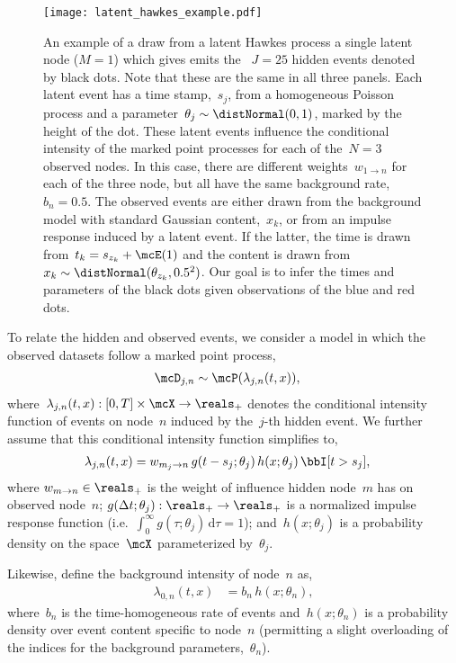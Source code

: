 \begin{figure}[t!]
\texttt{[image: latent\_hawkes\_example.pdf]}
\caption{An example of a draw from a latent Hawkes process
a single latent node ($M=1$) which gives emits the ~$J=25$ hidden
events denoted by black dots.  Note that these are the same in
all three panels. Each latent event has a time
stamp,~$s_j$, from a homogeneous Poisson process and a
parameter~$\theta_j \sim \distNormal(0,1)$, marked by the height of
the dot. These latent events influence the conditional intensity of
the marked point processes for each of the~$N=3$ observed nodes. In
this case, there are different weights~$w_{1 \to n}$ for each of the
three node, but all have the same background rate,~$b_n=0.5$. The
observed events are either drawn from the background model with
standard Gaussian content,~$x_k$, or from an impulse response induced
by a latent event. If the latter, the time is drawn from~$t_k =
s_{z_k} + \mcE(1)$ and the content is drawn from
$x_k \sim \distNormal(\theta_{z_k}, 0.5^2)$. Our goal is to infer the
times and parameters of the black dots given observations of the blue
and red dots.}
\end{figure}

To relate the hidden and observed events,
we consider a model in which the observed datasets follow a marked
point process,
\begin{align}
  \mcD_{j,n} &\sim \mcP(\lambda_{j,n}(t, x)),
\end{align}
where~$\lambda_{j,n}(t, x): [0,T] \times \mcX \to \reals_+$ denotes
the conditional intensity function of events on node~$n$ induced by
the~$j$-th hidden event.  We further assume that this conditional
intensity function simplifies to,
\begin{align}
  \lambda_{j,n}(t, x)
  &= w_{m_j \to n} \, g(t-s_j; \theta_j) \, h(x; \theta_j) \, \bbI[t > s_j],
\end{align}
where $w_{m \to n} \in \reals_+$ is the weight of influence hidden
node~$m$ has on observed node~$n$; ${g(\Delta
t; \theta_j): \reals_+ \to \reals_+}$ is a normalized impulse response
function (i.e.~$\int_0^\infty g(\tau; \theta_j) \, \mathrm{d}\tau =
1$); and~$h(x; \theta_j)$ is a probability density on the space~$\mcX$
parameterized by~$\theta_j$.

Likewise, define the background intensity of node~$n$ as,
\begin{align}
  \lambda_{0,n}(t,x) &= b_n \, h(x; \theta_n),
\end{align}
where~$b_n$ is the time-homogeneous rate of events
and~$h(x; \theta_n)$ is a probability density over event content
specific to node~$n$ (permitting a slight overloading of the indices
for the background parameters,~$\theta_n$).

